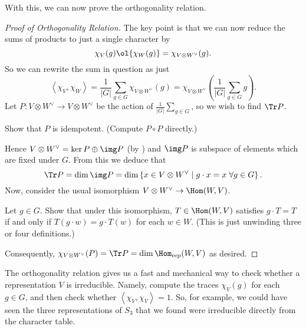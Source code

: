 With this, we can now prove the orthogonality relation.
\begin{proof}
	[Proof of Orthogonality Relation]
	The key point is that we can now reduce
	the sums of products to just a single character by
	\[ \chi_V(g) \ol{\chi_W(g)} = \chi_{V \otimes W^\vee} (g). \]
	So we can rewrite the sum in question as just
	\[
		\left< \chi_V, \chi_W \right>
		= \frac{1}{|G|} \sum_{g \in G} \chi_{V \otimes W^\vee} (g)
		= \chi_{V \otimes W^\vee}
		\left( \frac{1}{|G|} \sum_{g \in G} g \right).
	\]
	Let $P : V \otimes W^\vee \to V \otimes W^\vee$ be the
	action of $\frac{1}{|G|} \sum_{g \in G}$,
	so we wish to find $\Tr P$.
	\begin{exercise}
		Show that $P$ is idempotent.
		(Compute $P \circ P$ directly.)
	\end{exercise}
	Hence $V \otimes W^\vee = \ker P \oplus \img P$ (by )
	and $\img P$ is subspace of elements which are fixed under $G$.
	From this we deduce that
	\[ \Tr P = \dim \img P =
		\dim \left\{ x \in V \otimes W^\vee
		\mid g \cdot x = x \; \forall g \in G  \right\}.
		\]
	Now, consider the usual isomorphism $V \otimes W^\vee \to \Hom(W, V)$.
	\begin{exercise}
		Let $g \in G$.
		Show that under this isomorphism, $T \in \Hom(W, V)$
		satisfies $g \cdot T = T$ if and only if
		$T(g \cdot w) = g \cdot T(w)$ for each $w \in W$.
		(This is just unwinding three or four definitions.)
	\end{exercise}
	Consequently, $\chi_{V \otimes W^\vee}(P) = \Tr P = \dim \Homrep(W,V)$
	as desired.
\end{proof}


The orthogonality relation gives us a fast and mechanical way to check
whether a representation $V$ is irreducible.
Namely, compute the traces $\chi_V(g)$ for each $g \in G$,
and then check whether $\left< \chi_V, \chi_V \right> = 1$.
So, for example, we could have seen the three representations of
$S_3$ that we found were irreducible directly from the character table.


